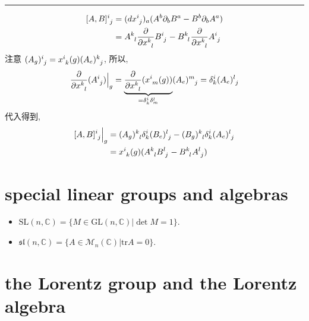 \begin{itemize}
\begin{tcolorbox}[title=proof:]
		\noindent\rule[0.5ex]{\linewidth}{0.5pt} %
		
		\begin{align}
			\tensor{[A, B]}{^i_j} &= (d\tensor{x}{^i_j})_a (A^b \partial_b B^a - B^b \partial_b A^a) \notag \\
			&= \tensor{A}{^k_l} \frac{\partial}{\partial \tensor{x}{^k_l}} \tensor{B}{^i_j} - \tensor{B}{^k_l} \frac{\partial}{\partial \tensor{x}{^k_l}} \tensor{A}{^i_j}
		\end{align}
		注意 $\tensor{(A_g)}{^i_j} = \tensor{x}{^i_k}(g) \tensor{(A_e)}{^k_j}$, 所以,
		\begin{equation}
			\frac{\partial}{\partial \tensor{x}{^k_l}} (\tensor{A}{^i_j}) \Big|_g = \underbrace{\frac{\partial}{\partial \tensor{x}{^k_l}} (\tensor{x}{^i_m}(g))}_{= \delta^i_k \delta^l_m} \tensor{(A_e)}{^m_j} = \delta^i_k \tensor{(A_e)}{^l_j}
		\end{equation}
		代入得到,
		\begin{align}
			\tensor{[A, B]}{^i_j} \Big|_g &= \tensor{(A_g)}{^k_l} \delta^i_k \tensor{(B_e)}{^l_j} - \tensor{(B_g)}{^k_l} \delta^i_k \tensor{(A_e)}{^l_j} \notag \\
			&= \tensor{x}{^i_k}(g) (\tensor{A}{^k_l} \tensor{B}{^l_j} - \tensor{B}{^k_l} \tensor{A}{^l_j})
		\end{align}
	\end{tcolorbox}
\end{itemize}

\section{special linear groups and algebras}
\begin{itemize}
	\item $\mathrm{SL}(n, \mathbb{C}) = \{M \in \mathrm{GL}(n, \mathbb{C}) | \det M = 1\}$.
	
	\item $\mathfrak{sl}(n, \mathbb{C}) = \{A \in \mathcal{M}_n(\mathbb{C}) | \mathrm{tr} A = 0\}$.
\end{itemize}

\section{the Lorentz group and the Lorentz algebra}
